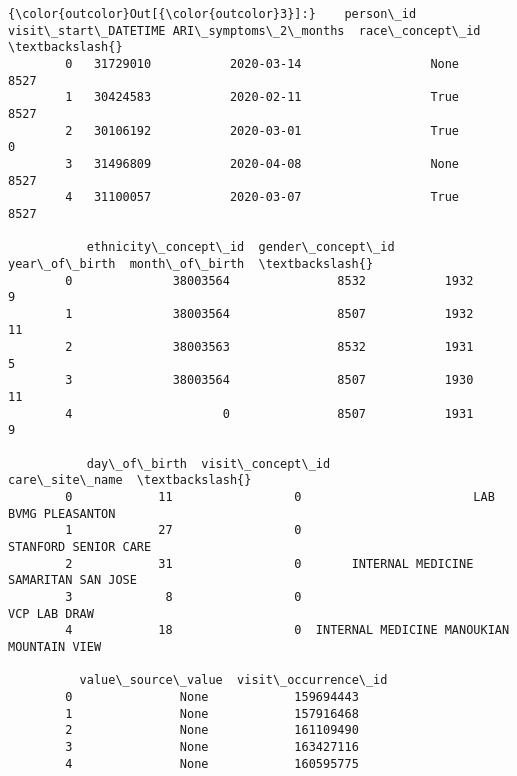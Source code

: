 \documentclass[11pt]{article}
\begin{document}
\begin{Verbatim}[commandchars=\\\{\}]
{\color{outcolor}Out[{\color{outcolor}3}]:}    person\_id visit\_start\_DATETIME ARI\_symptoms\_2\_months  race\_concept\_id  \textbackslash{}
        0   31729010           2020-03-14                  None             8527   
        1   30424583           2020-02-11                  True             8527   
        2   30106192           2020-03-01                  True                0   
        3   31496809           2020-04-08                  None             8527   
        4   31100057           2020-03-07                  True             8527   
        
           ethnicity\_concept\_id  gender\_concept\_id  year\_of\_birth  month\_of\_birth  \textbackslash{}
        0              38003564               8532           1932               9   
        1              38003564               8507           1932              11   
        2              38003563               8532           1931               5   
        3              38003564               8507           1930              11   
        4                     0               8507           1931               9   
        
           day\_of\_birth  visit\_concept\_id                             care\_site\_name  \textbackslash{}
        0            11                 0                        LAB BVMG PLEASANTON   
        1            27                 0                       STANFORD SENIOR CARE   
        2            31                 0       INTERNAL MEDICINE SAMARITAN SAN JOSE   
        3             8                 0                               VCP LAB DRAW   
        4            18                 0  INTERNAL MEDICINE MANOUKIAN MOUNTAIN VIEW   
        
          value\_source\_value  visit\_occurrence\_id  
        0               None            159694443  
        1               None            157916468  
        2               None            161109490  
        3               None            163427116  
        4               None            160595775  
\end{Verbatim}
            
\end{document}

